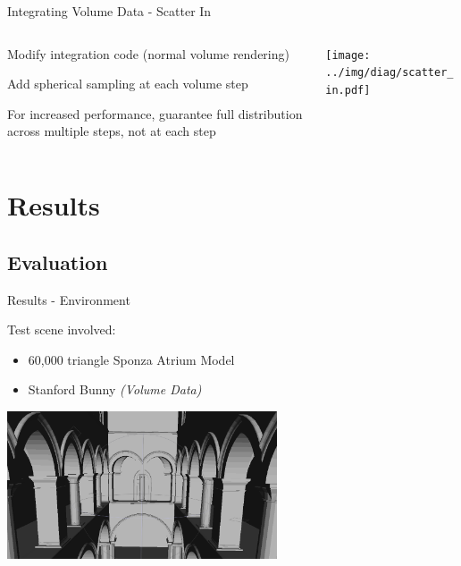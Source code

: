 \documentclass[10pt,compress,professionalfont]{beamer}
\begin{document}
\begin{frame}{Integrating Volume Data - Scatter In}

    \begin{columns}
        \begin{column}{0.5\textwidth}

            Modify integration code (normal volume rendering)\\
            \vspace{8mm}

            Add spherical sampling at each volume step\\
            \vspace{8mm}

            For increased performance, guarantee full distribution across multiple steps, not at each step

        \end{column}
        \begin{column}{0.5\textwidth}
            \texttt{[image: ../img/diag/scatter\_in.pdf]}\\
        \end{column}
    \end{columns}

\end{frame}




\section{Results}
\subsection{Evaluation}
\begin{frame}{Results - Environment}

    Test scene involved:
    \begin{itemize}
        \item 60,000 triangle Sponza Atrium Model\\
        \vspace{2mm}
        \item Stanford Bunny \textit{(Volume Data)}
    \end{itemize}
    \vspace{10mm}
    {\centering
    \includegraphics[width=80mm]{../img/sponza_vis}\\
    }

\end{frame}
\end{document}
